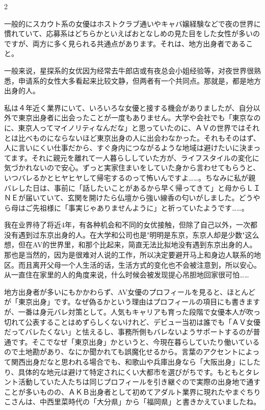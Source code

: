 \documentclass[12pt,UTF8]{ctexbook}
\begin{document}
\begin{paracol}{2}

一般的にスカウト系の女優はホストクラブ通いやキャバ嬢経験などで夜の世界に慣れていて、応募系はどちらかといえばおとなしめの見た目をした女性が多いのですが、両方に多く見られる共通点があります。それは、地方出身者であること。

\switchcolumn

一般来说，星探系的女优因为经常去牛郎店或有夜总会小姐经验等，对夜世界很熟悉，申请系的女性大多看起来比较文静，但两者有一个共同点。那就是，都是地方出身的人。

\switchcolumn*

私は４年近く業界にいて、いろいろな女優と接する機会がありましたが、自分以外で東京出身者に出会ったことが一度もありません。大学や会社でも「東京なのに、東京人ってマイノリティなんだな」と思っていたのに、ＡＶの世界ではそれとは比べものにならないほど東京出身の人に出会わなかった。それもそのはず、人に言いにくい仕事だから、すぐ身内につながるような地域は避けたいに決まってます。それに親元を離れて一人暮らししていた方が、ライフスタイルの変化に気づかれないので安心。ずっと実家住まいをしていた身から言わせてもらうと、いつバレるかとヒヤヒヤして帰宅するのって怖いんですよ……。ちなみに私が親バレした日は、事前に「話したいことがあるから早く帰ってきて」と母からＬＩＮＥが届いていて、玄関を開けたら仏壇から強い線香の匂いがしました。どうやら母はご先祖様に「事実じゃありませんように」と祈っていたようです……。

\switchcolumn

我在业界待了将近4年，有各种机会和不同的女优接触，但除了自己以外，一次都没有遇到过东京出身的人。在大学和公司也是"明明是东京，东京人却是少数"这么想，但在AV的世界里，和那个比起来，简直无法比拟地没有遇到东京出身的人。那也是当然的，因为是很难对人说的工作，所以决定要避开马上和身边人联系的地区。而且离开父母一个人生活的话，生活方式的变化也不会被注意到，所以安心。从一直住在家里的人的角度来说，什么时候会被发现提心吊胆地回家很可怕……

\switchcolumn*

地方出身者が多いにもかかわらず、AV女優のプロフィールを見ると、ほとんどが「東京出身」です。なぜ偽るかという理由はプロフィールの項目にも書きますが、一番は身元バレ対策として。人気もキャリアも育った段階で女優本人が吹っ切れて公表することはめずらしくないけれど、デビュー当初は誰でも「ＡＶ女優だってバレたくない」と怯えるし、事務所側もバレないようサポートするのが普通です。そこでなぜ「東京出身」かというと、今現在暮らしていたり働いているので土地勘があり、なにか聞かれても誤魔化せるから。言葉のアクセントによって関西出身だなと思われる場合でも、和歌山や兵庫出身なら「大阪出身」にしたり、具体的な地元は避けて特定されにくい大都市を選びがちです。もともとタレント活動していた人たちは同じプロフィールを引き継ぐので実際の出身地で通すことが多いものの、ＡＫＢ出身者として初めてアダルト業界に現れたやまぐちりこさんは、中西里菜時代の「大分県」から「福岡県」と書きかえていましたね。


\end{paracol}
\end{document}
